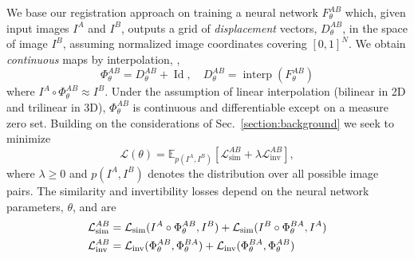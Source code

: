 \documentclass[10pt,twocolumn,letterpaper]{article} %
\begin{document}
We base our registration approach on training a neural network $F_\theta^{AB}$ which, given input images $I^A$ and $I^B$, outputs a grid of \emph{displacement} vectors, $D_\theta^{AB}$, in the space of image $I^B$, assuming normalized image coordinates covering $[0,1]^N$. We obtain \emph{continuous} maps by interpolation, \ie, 
\begin{equation}
  \Phi_\theta^{AB} = D_{\theta}^{AB} + \operatorname{Id}, \quad D_{\theta}^{AB} = \operatorname{interp}(F_{\theta}^{AB})
  \label{eq:map_interpolation}
\end{equation}
where $I^A\circ\Phi_\theta^{AB} \approx I^B$. Under the assumption of linear interpolation (bilinear in 2D and trilinear in 3D), $\Phi_\theta^{AB}$ is continuous and differentiable except on a measure zero set. Building on the considerations of Sec.~\ref{section:background} we seek to minimize %
\begin{equation}
  \mathcal{L}(\theta) = \mathbb{E}_{p(I^A,I^B)}\left[\mathcal{L}_{\text{sim}}^{AB} + \lambda \mathcal{L}_{\text{inv}}^{AB}\right],\label{eq:overall_loss}
\end{equation}
where $\lambda\geq 0$ and $p(I^A,I^B)$ denotes the distribution over all possible image pairs. The similarity and invertibility losses depend on the neural network parameters, $\theta$, and are 
\begin{alignat}{1}
  \mathcal{L}_{\text{sim}}^{AB} &= \mathcal{L}_{\text{sim}}(I^A \circ \Phi_\theta^{AB}, I^B) + \mathcal{L}_{\text{sim}}(I^B \circ \Phi_\theta^{BA}, I^A) \notag \\
  \mathcal{L}_{\text{inv}}^{AB} &= \mathcal{L}_{\text{inv}}(\Phi_\theta^{AB},\Phi_\theta^{BA}) + \mathcal{L}_{\text{inv}}(\Phi_\theta^{BA},\Phi_\theta^{AB})
\label{eqn:similarity_and_consistency_loss}
\end{alignat}
\end{document}
